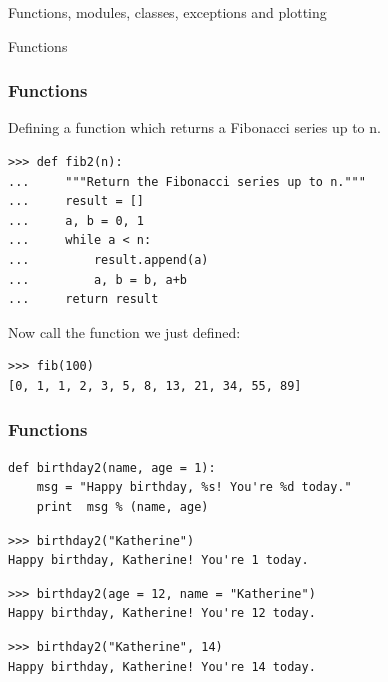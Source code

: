 \begin{frame}
\begin{center}
\Huge{Functions, modules, classes, exceptions and plotting}
\end{center}
\end{frame}

\begin{frame}
    \begin{center}
    \Huge{Functions}
    \end{center}
\end{frame}

\begin{frame}[fragile]
    \frametitle{Functions}
Defining a function which returns a Fibonacci series up to n.
    \begin{myColorBox}{0.9}{}
\begin{verbatim}
>>> def fib2(n):
...     """Return the Fibonacci series up to n."""
...     result = []
...     a, b = 0, 1
...     while a < n:
...         result.append(a)
...         a, b = b, a+b
...     return result
\end{verbatim}
    \end{myColorBox}
\pause
Now call the function we just defined:
    \begin{myColorBox}{0.9}{}
\begin{verbatim}
>>> fib(100)
[0, 1, 1, 2, 3, 5, 8, 13, 21, 34, 55, 89]
\end{verbatim}
    \end{myColorBox}
\end{frame}

\begin{frame}[fragile]
    \frametitle{Functions}
    \begin{myColorBox}{0.9}{}
\begin{verbatim}
def birthday2(name, age = 1):
    msg = "Happy birthday, %s! You're %d today."
    print  msg % (name, age)
\end{verbatim}
    \end{myColorBox}
\pause
    \begin{myColorBox}{0.9}{}
\begin{verbatim}
>>> birthday2("Katherine")
Happy birthday, Katherine! You're 1 today.
\end{verbatim}
    \end{myColorBox}
\pause
    \begin{myColorBox}{0.9}{}
\begin{verbatim}
>>> birthday2(age = 12, name = "Katherine")
Happy birthday, Katherine! You're 12 today.
\end{verbatim}
    \end{myColorBox}
\pause
    \begin{myColorBox}{0.9}{}
\begin{verbatim}
>>> birthday2("Katherine", 14)
Happy birthday, Katherine! You're 14 today.
\end{verbatim}
    \end{myColorBox}
\end{frame}

